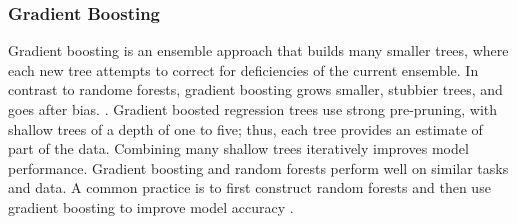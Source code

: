 \documentclass[sigconf]{acmart}
\begin{document}

\subsubsection{Gradient Boosting}

Gradient boosting is an ensemble approach that builds many smaller trees,  
where each new tree attempts to correct for deficiencies of the current 
ensemble. In contrast to randome forests, gradient boosting grows smaller, 
stubbier trees, and goes after bias. \cite{jamesetal13, kuhn13}. Gradient 
boosted regression trees use strong pre-pruning, with shallow trees of a 
depth of one to five; thus, each tree provides an estimate of part of the 
data. Combining many shallow trees iteratively improves model performance. 
Gradient boosting and random forests perform well on similar tasks and data. 
A common practice is to first construct random forests and then use gradient 
boosting to improve model accuracy \cite{muller17}. 

\end{document}
